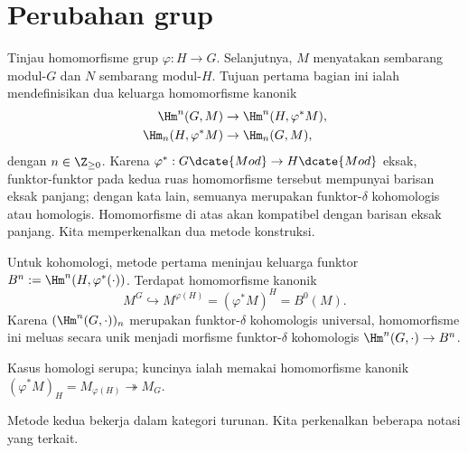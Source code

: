 
\section{Perubahan grup}\label{sec:change-of-group}
\hypertarget{o014.aljabr2.chapter6.change-of-group}{ }

Tinjau homomorfisme grup $\varphi:H\to G$. Selanjutnya, $M$ menyatakan
sembarang modul-$G$ dan $N$ sembarang modul-$H$. Tujuan pertama bagian ini ialah
mendefinisikan dua keluarga homomorfisme kanonik
\begin{equation}\label{eqn:change-of-group-coh}\begin{aligned}
	\Hm^n(G, M) & \to \Hm^n(H, \varphi^* M), \\
	\Hm_n(H, \varphi^* M) & \to \Hm_n(G, M),
\end{aligned}\end{equation}
dengan $n\in\Z_{\geq0}$. Karena
$\varphi^*:G\dcate{Mod}\to H\dcate{Mod}$ eksak, funktor-funktor pada kedua
ruas homomorfisme tersebut mempunyai barisan eksak panjang; dengan kata lain,
semuanya merupakan funktor-$\delta$ kohomologis atau homologis. Homomorfisme di
atas akan kompatibel dengan barisan eksak panjang. Kita memperkenalkan dua
metode konstruksi.

Untuk kohomologi, metode pertama meninjau keluarga funktor
$B^n:=\Hm^n(H,\varphi^*(\cdot))$. Terdapat homomorfisme kanonik
\[ M^G \hookrightarrow M^{\varphi(H)} = (\varphi^* M)^H =  B^0(M). \]
Karena $(\Hm^n(G,\cdot))_n$ merupakan funktor-$\delta$ kohomologis universal,
homomorfisme ini meluas secara unik menjadi morfisme funktor-$\delta$
kohomologis $\Hm^n(G,\cdot)\to B^n$.

Kasus homologi serupa; kuncinya ialah memakai homomorfisme kanonik
$(\varphi^*M)_H=M_{\varphi(H)}\twoheadrightarrow M_G$.

Metode kedua bekerja dalam kategori turunan. Kita perkenalkan beberapa notasi
yang terkait.

